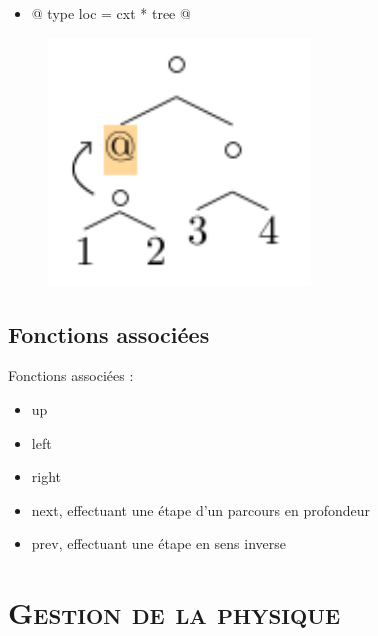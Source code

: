 \documentclass[xcolor=x11names,compress,11pt]{beamer}
\makeatletter
\renewcommand{\(}{\begin{columns}}
\renewcommand{\)}{\end{columns}}
\newcommand{\<}[1]{\begin{column}{#1}}
\renewcommand{\>}{\end{column}}
\newcommand{\inline}[1]{{\footnotesize \mint{ocaml}@ #1 @}}
\makeatother
\begin{document}
\begin{frame}
   {
    \begin{itemize}
    \item \inline{type loc = cxt * tree}
    \end{itemize}

    \begin{figure}[h]
      \centering
      \includegraphics[scale=0.45]{plug_loc.pdf}
    \end{figure}
  }

\end{frame}

\subsection*{Fonctions associées}
\begin{frame}
  Fonctions associées :
  \begin{itemize}
  \item up
  \item left
  \item right
  \item next, effectuant une étape d'un parcours en profondeur
  \item prev, effectuant une étape en sens inverse
  \end{itemize}

\end{frame}

\section{\scshape Gestion de la physique}
\end{document}
